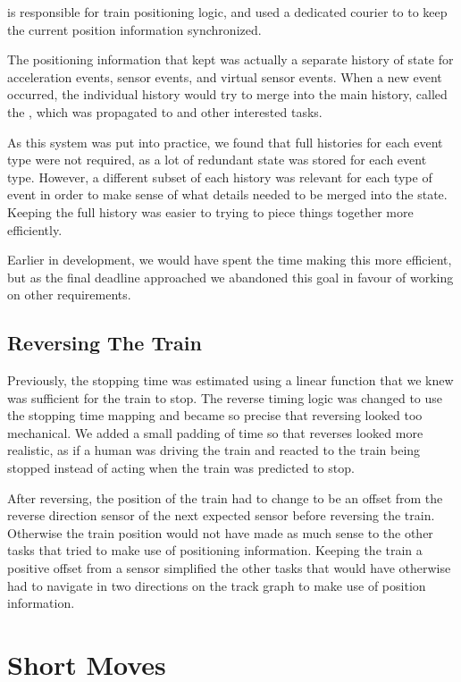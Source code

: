 \documentclass[pdftex,10pt,a4paper]{article}
\begin{document}
 is responsible for train positioning logic, and used a
dedicated courier to  to keep the current position
information synchronized.

The positioning information that  kept was actually a
separate history of state for acceleration events, sensor events, and
virtual sensor events. When a new event occurred, the individual
history would try to merge into the main history, called the
, which was propagated to  and other interested
tasks.

As this system was put into practice, we found that full histories for
each event type were not required, as a lot of redundant state was
stored for each event type. However, a different subset of each
history was relevant for each type of event in order to make sense of
what details needed to be merged into the  state. Keeping
the full history was easier to trying to piece things together more
efficiently.

Earlier in development, we would have spent the time making this more
efficient, but as the final deadline approached we abandoned this goal
in favour of working on other requirements.

\subsection*{Reversing The Train}

Previously, the stopping time was estimated using a linear function
that we knew was sufficient for the train to stop. The reverse timing
logic was changed to use the stopping time mapping and became so
precise that reversing looked too mechanical. We added a small padding
of time so that reverses looked more realistic, as if a human was
driving the train and reacted to the train being stopped instead of
acting when the train was predicted to stop.

After reversing, the position of the train had to change to be an
offset from the reverse direction sensor of the next expected sensor
before reversing the train. Otherwise the train position would not
have made as much sense to the other tasks that tried to make use
of positioning information. Keeping the train a positive offset from a
sensor simplified the other tasks that would have otherwise had to
navigate in two directions on the track graph to make use of position
information.

\section*{Short Moves}
\end{document}

